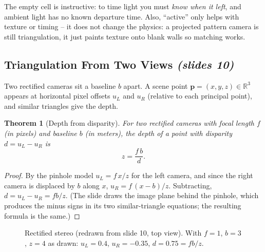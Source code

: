 \documentclass[11pt,a4paper]{article}
\numberwithin{equation}{section}
\newcommand{\slides}[1]{\texorpdfstring{\;\emph{(slides #1)}}{ (slides #1)}}
\newcommand{\R}{\mathbb{R}}
\theoremstyle{plain}
\newtheorem{theorem}{Theorem}[section]
\theoremstyle{definition}
\begin{document}
\begin{intuition}
The empty cell is instructive: to time light you must \emph{know when it left}, and ambient light has no known departure time. Also, ``active'' only helps with texture or timing -- it does not change the physics: a projected pattern camera is still triangulation, it just paints texture onto blank walls so matching works.
\end{intuition}
 
\subsection{Triangulation From Two Views \slides{10}}
 
Two rectified cameras sit a baseline $b$ apart. A scene point $\bm p=(x,y,z)\in\R^3$ appears at horizontal pixel offsets $u_L$ and $u_R$ (relative to each principal point), and similar triangles give the depth.
 
\begin{theorem}[Depth from disparity]\label{thm:stereo}
For two rectified cameras with focal length $f$ (in pixels) and baseline $b$ (in meters), the depth of a point with disparity $d=u_L-u_R$ is
\[
z=\frac{f\,b}{d}.
\]
\end{theorem}
\begin{proof}
By the pinhole model $u_L=f\,x/z$ for the left camera, and since the right camera is displaced by $b$ along $x$, $u_R=f\,(x-b)/z$. Subtracting, $d=u_L-u_R=fb/z$. (The slide draws the image plane behind the pinhole, which produces the minus signs in its two similar-triangle equations; the resulting formula is the same.) \qedhere
\end{proof}
 
\begin{figure}[htbp]
\centering
{}
\caption{Rectified stereo (redrawn from slide 10, top view). With $f=1$, $b=3$, $z=4$ as drawn: $u_L=0.4$, $u_R=-0.35$, $d=0.75=fb/z$.}
\end{figure}
 
\end{document}
